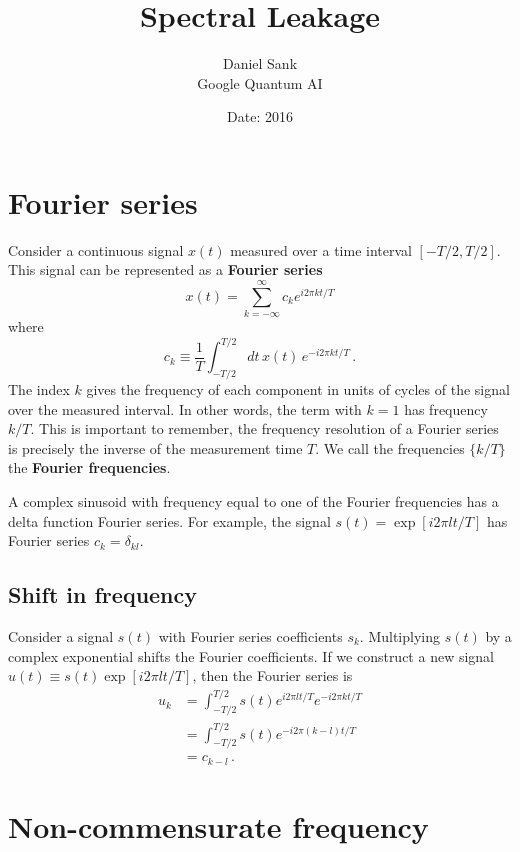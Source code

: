 \documentclass[twocolumn]{article}
\title{Spectral Leakage}
\author{Daniel Sank \\ \small{Google Quantum AI}}
\date{Date: 2016}
\begin{document}
\maketitle


\section{Fourier series}

Consider a continuous signal $x(t)$ measured over a time interval $[-T/2, T/2]$.
This signal can be represented as a \textbf{Fourier series}
\begin{equation}
x(t) = \sum_{k=-\infty}^\infty c_k e^{i 2 \pi k t / T}
\end{equation}
where
\begin{equation}
c_k \equiv \frac{1}{T} \int_{-T/2}^{T/2} dt \, x(t) \, e^{-i 2 \pi k t / T} \, .
\end{equation}
The index $k$ gives the frequency of each component in units of cycles of the signal over the measured interval.
In other words, the term with $k=1$ has frequency $k/T$.
This is important to remember, the frequency resolution of a Fourier series is precisely the inverse of the measurement time $T$.
We call the frequencies $\{k/T\}$ the \textbf{Fourier frequencies}.

A complex sinusoid with frequency equal to one of the Fourier frequencies has a delta function Fourier series.
For example, the signal $s(t) = \exp \left[ i 2 \pi l t / T \right]$ has Fourier series $c_k = \delta_{kl}$.

\subsection{Shift in frequency}

Consider a signal $s(t)$ with Fourier series coefficients $s_k$.
Multiplying $s(t)$ by a complex exponential shifts the Fourier coefficients.
If we construct a new signal $u(t) \equiv s(t) \exp[i2\pi l t / T]$, then the Fourier series is
\begin{align}
u_k
&= \int_{-T/2}^{T/2} s(t) e^{i 2 \pi l t / T} e^{-i 2 \pi k t/ T} \nonumber \\
&= \int_{-T/2}^{T/2} s(t) e^{-i 2 \pi (k-l) t/ T} \nonumber \\
&= c_{k-l} \, .
\end{align}


\section{Non-commensurate frequency}
\end{document}
